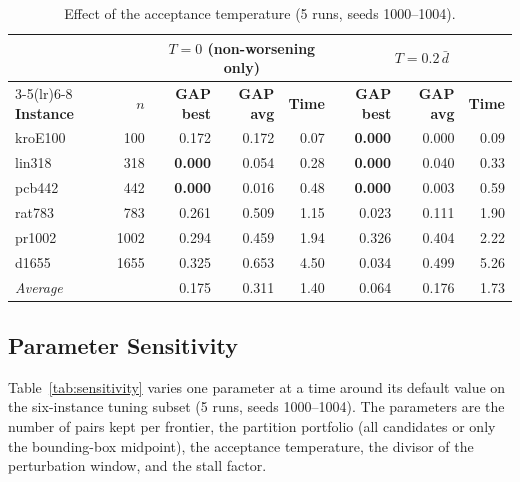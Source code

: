 \documentclass[runningheads]{llncs}
\begin{document}
\begin{table}
\caption{Effect of the acceptance temperature (5 runs, seeds
1000--1004).}
\label{tab:ablation}
\centering\scriptsize
\begin{tabular}{@{}lrrrrrrr@{}}
\toprule
& & \multicolumn{3}{c}{$T=0$ (non-worsening only)} & \multicolumn{3}{c}{$T=0.2\,\bar d$} \\
\cmidrule(lr){3-5}\cmidrule(lr){6-8}
\textbf{Instance} & $n$ & \textbf{GAP best} & \textbf{GAP avg} & \textbf{Time} & \textbf{GAP best} & \textbf{GAP avg} & \textbf{Time} \\
\midrule
kroE100 &  100 & 0.172 & 0.172 & 0.07 & \textbf{0.000} & 0.000 & 0.09 \\
lin318  &  318 & \textbf{0.000} & 0.054 & 0.28 & \textbf{0.000} & 0.040 & 0.33 \\
pcb442  &  442 & \textbf{0.000} & 0.016 & 0.48 & \textbf{0.000} & 0.003 & 0.59 \\
rat783  &  783 & 0.261 & 0.509 & 1.15 & 0.023 & 0.111 & 1.90 \\
pr1002  & 1002 & 0.294 & 0.459 & 1.94 & 0.326 & 0.404 & 2.22 \\
d1655   & 1655 & 0.325 & 0.653 & 4.50 & 0.034 & 0.499 & 5.26 \\
\midrule
\textit{Average} & & 0.175 & 0.311 & 1.40 & 0.064 & 0.176 & 1.73 \\
\bottomrule
\end{tabular}
\end{table}

\subsection{Parameter Sensitivity}
\label{sec:sensitivity}

Table~\ref{tab:sensitivity} varies one parameter at a time around its
default value on the six-instance tuning subset (5 runs, seeds
1000--1004). The parameters are the number of pairs kept per frontier,
the partition portfolio (all candidates or only the bounding-box
midpoint), the acceptance temperature, the divisor of the perturbation
window, and the stall factor.
\end{document}
